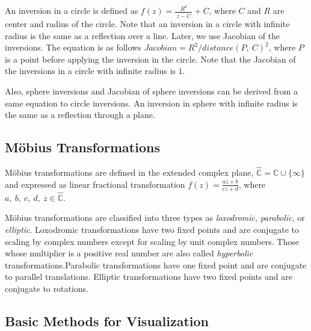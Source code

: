 An inversion in a circle is defined as $f(z) = \frac{R^2}{~\overline{z -C}~} + C$,
where $C$ and $R$ are center and radius of the circle.
Note that an inversion in a circle with infinite radius is the same as
a reflection over a line.
Later, we use Jacobian of the inversions. The equation is as follows
$Jacobian = R^2 / distance(P,~C)^2$, where $P$ is a point before
applying the inversion in the circle.
Note that the Jacobian of the inversions in a circle with
infinite radius is $1$.

Also, sphere inversions and Jacobian of sphere inversions can be
derived from a same equation to circle inversions.
An inversion in sphere with infinite radius is the same as a reflection
through a plane.

\subsection{M\"obius Transformations}

M\"obius transformations are defined in the extended complex plane,
$\hat{\mathbb{C}} = \mathbb{C} \cup \{\infty\}$ and expressed as linear
fractional transformation
$f(z)=\frac{az + b}{cz + d}$, where $a,~b,~c,~d,~z \in \hat{\mathbb{C}}$.

M\"obius transformations are classified into three types as \textit{loxodromic},
\textit{parabolic}, or \textit{elliptic}.
Loxodromic transformations have two fixed points and are conjugate to
scaling by complex numbers except for scaling by unit complex numbers.
Those whose multiplier is a positive real number
are also called \textit{hyperbolic} transformations.Parabolic transformations
have one fixed point and are conjugate to parallel translations.
Elliptic transformations have two fixed points and are conjugate to rotations.

\subsection{Basic Methods for Visualization}

